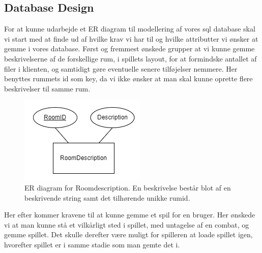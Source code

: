 \subsection{Database Design}
For at kunne udarbejde et ER diagram til modellering af vores sql database skal vi start med at finde ud af hvilke krav vi har til og hvilke attributter vi ønsker at gemme i vores database.
Først og fremmest ønskede grupper at vi kunne gemme beskrivelserne af de forskellige rum, i spillets layout, for at formindske antallet af filer i klienten, og samtidigt gøre eventuelle senere tilføjelser nemmere. Her benyttes rummets id som key, da vi ikke ønsker at man skal kunne oprette flere beskrivelser til samme rum.

\begin{figure}[h]
\centering
\includegraphics[width = \textwidth]{02-Body/Images/ER-RoomDescription.PNG}
\caption{ER diagram for Roomdescription. En beskrivelse består blot af en beskrivende string samt det tilhørende unikke rumid.}
\label{fig:ER-Roomdescription}
\end{figure}

Her efter kommer kravene til at kunne gemme et spil for en bruger. Her ønskede vi at man kunne stå et vilkårligt sted i spillet, med untagelse af en combat, og gemme spillet. Det skulle derefter være muligt for spilleren at loade spillet igen, hvorefter spillet er i samme stadie som man gemte det i.

